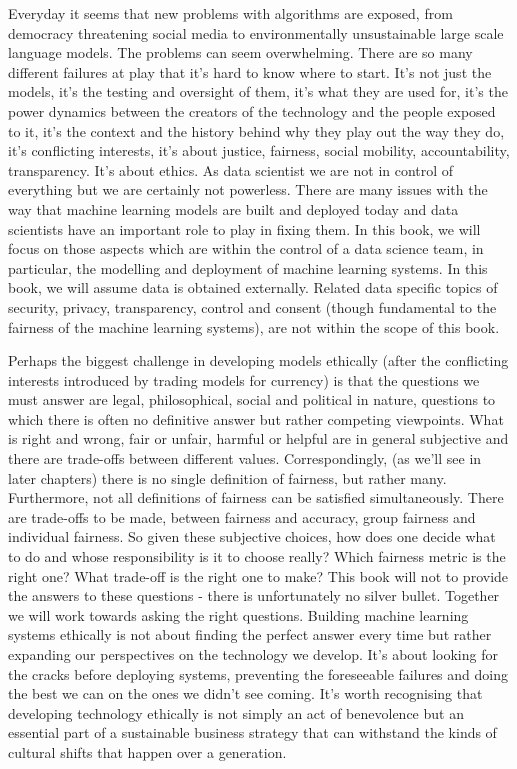 Everyday it seems that new problems with algorithms are exposed, from democracy threatening social media to environmentally unsustainable large scale language models. The problems can seem overwhelming. There are so many different failures at play that it's hard to know where to start. It's not just the models, it's the testing and oversight of them, it's what they are used for, it's the power dynamics between the creators of the technology and the people exposed to it, it's the context and the history behind why they play out the way they do, it's conflicting interests, it's about justice, fairness, social mobility, accountability, transparency. It's about ethics. As data scientist we are not in control of everything but we are certainly not powerless. There are many issues with the way that machine learning models are built and deployed today and data scientists have an important role to play in fixing them. In this book, we will focus on those aspects which are within the control of a data science team, in particular, the modelling and deployment of machine learning systems. In this book, we will assume data is obtained externally. Related data specific topics of security, privacy, transparency, control and consent (though fundamental to the fairness of the machine learning systems), are not within the scope of this book.

Perhaps the biggest challenge in developing models ethically (after the conflicting interests introduced by trading models for currency) is that the questions we must answer are legal, philosophical, social and political in nature, questions to which there is often no definitive answer but rather competing viewpoints. What is right and wrong, fair or unfair, harmful or helpful are in general subjective and there are trade-offs between different values. Correspondingly, (as we'll see in later chapters) there is no single definition of fairness, but rather many. Furthermore, not all definitions of fairness can be satisfied simultaneously. There are trade-offs to be made, between fairness and accuracy, group fairness and individual fairness. So given these subjective choices, how does one decide what to do and whose responsibility is it to choose really? Which fairness metric is the right one? What trade-off is the right one to make? This book will not to provide the answers to these questions - there is unfortunately no silver bullet. Together we will work towards asking the right questions. Building machine learning systems ethically is not about finding the perfect answer every time but rather expanding our perspectives on the technology we develop. It's about looking for the cracks before deploying systems, preventing the foreseeable failures and doing the best we can on the ones we didn't see coming. It's worth recognising that developing technology ethically is not simply an act of benevolence but an essential part of a sustainable business strategy that can withstand the kinds of cultural shifts that happen over a generation.

